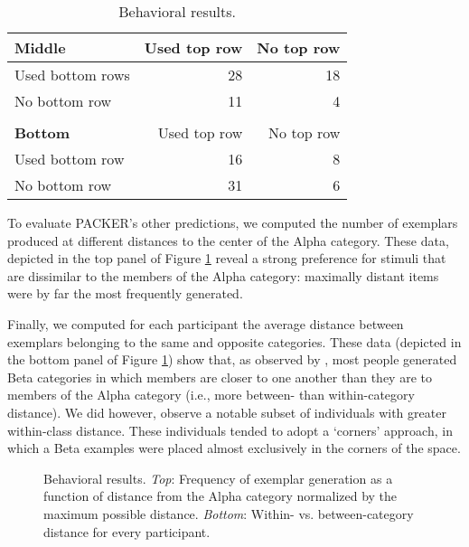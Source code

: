 \documentclass[10pt,letterpaper]{article}
\newcommand\inputpgf[2]{{
\let\pgfimageWithoutPath\pgfimage
\renewcommand{\pgfimage}[2][]{\pgfimageWithoutPath[##1]{#1/##2}}

}}
\begin{document}
\begin{table}
\begin{center} 
\label{table:subset-table} 
\vskip 0.12in
\begin{tabular}{ l r r}
    \textbf{Middle}         & Used top row & No top row \\
    \hline
    Used bottom rows       &  28 & 18  \\
    No bottom row          &  11 &  4  \\
    \\
    \textbf{Bottom}         & Used top row & No top row \\
    \hline
    Used bottom row        & 16 & 8 \\
    No bottom row          & 31 & 6 \\
\end{tabular}
\caption{Behavioral results.} 
\end{center} 
\end{table}
To evaluate PACKER's other predictions, we computed the number of exemplars produced at different distances to the center of the Alpha category. These data, depicted in the top panel of Figure \ref{fig:distance.figs} reveal a strong preference for stimuli that are dissimilar to the members of the Alpha category: maximally distant items were by far the most frequently generated. 

Finally, we computed for each participant the average distance between exemplars belonging to the same and opposite categories. These data (depicted in the bottom panel of Figure \ref{fig:distance.figs}) show that, as observed by \citet{ward1994structured}, most people generated Beta categories in which members are closer to one another than they are to members of the Alpha category (i.e., more between- than within-category distance). We did however, observe a notable subset of individuals with greater within-class distance. These individuals tended to adopt a `corners' approach, in which a Beta examples were placed almost exclusively in the corners of the space.

\begin{figure}
    \begin{center}
    \inputpgf{figs/}{distance.figs.pgf}
    \caption{Behavioral results. \textit{Top}: Frequency of exemplar generation as a function of distance from the Alpha category normalized by the maximum possible distance. \textit{Bottom}: Within- vs. between-category distance for every participant. }
    \label{fig:distance.figs}
    \end{center}
\end{figure}
\end{document}
